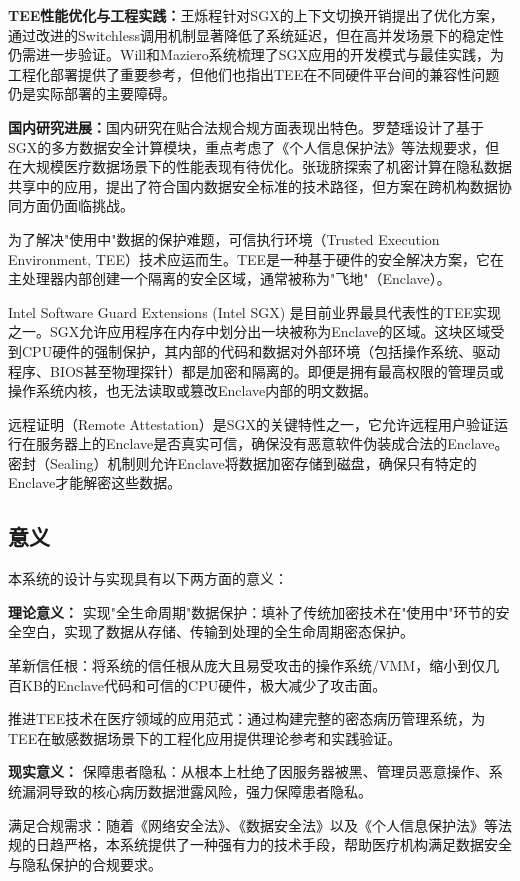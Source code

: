 \documentclass{article}
\begin{document}
\textbf{TEE性能优化与工程实践：}王烁程\cite{ref11}针对SGX的上下文切换开销提出了优化方案，通过改进的Switchless调用机制显著降低了系统延迟，但在高并发场景下的稳定性仍需进一步验证。Will和Maziero\cite{ref12}系统梳理了SGX应用的开发模式与最佳实践，为工程化部署提供了重要参考，但他们也指出TEE在不同硬件平台间的兼容性问题仍是实际部署的主要障碍。

\textbf{国内研究进展：}国内研究在贴合法规合规方面表现出特色。罗楚瑶\cite{ref3}设计了基于SGX的多方数据安全计算模块，重点考虑了《个人信息保护法》等法规要求，但在大规模医疗数据场景下的性能表现有待优化。张珑脐\cite{ref6}探索了机密计算在隐私数据共享中的应用，提出了符合国内数据安全标准的技术路径，但方案在跨机构数据协同方面仍面临挑战。

为了解决"使用中"数据的保护难题，可信执行环境（Trusted Execution Environment, TEE）技术应运而生。TEE是一种基于硬件的安全解决方案，它在主处理器内部创建一个隔离的安全区域，通常被称为"飞地"（Enclave）。

Intel Software Guard Extensions (Intel SGX) 是目前业界最具代表性的TEE实现之一。SGX允许应用程序在内存中划分出一块被称为Enclave的区域。这块区域受到CPU硬件的强制保护，其内部的代码和数据对外部环境（包括操作系统、驱动程序、BIOS甚至物理探针）都是加密和隔离的。即便是拥有最高权限的管理员或操作系统内核，也无法读取或篡改Enclave内部的明文数据。

远程证明（Remote Attestation）是SGX的关键特性之一，它允许远程用户验证运行在服务器上的Enclave是否真实可信，确保没有恶意软件伪装成合法的Enclave。密封（Sealing）机制则允许Enclave将数据加密存储到磁盘，确保只有特定的Enclave才能解密这些数据。

\subsection*{意义}
本系统的设计与实现具有以下两方面的意义：

\textbf{理论意义：}
实现"全生命周期"数据保护：填补了传统加密技术在"使用中"环节的安全空白，实现了数据从存储、传输到处理的全生命周期密态保护。

革新信任根：将系统的信任根从庞大且易受攻击的操作系统/VMM，缩小到仅几百KB的Enclave代码和可信的CPU硬件，极大减少了攻击面。

推进TEE技术在医疗领域的应用范式：通过构建完整的密态病历管理系统，为TEE在敏感数据场景下的工程化应用提供理论参考和实践验证。

\textbf{现实意义：}
保障患者隐私：从根本上杜绝了因服务器被黑、管理员恶意操作、系统漏洞导致的核心病历数据泄露风险，强力保障患者隐私。

满足合规需求：随着《网络安全法》、《数据安全法》以及《个人信息保护法》等法规的日趋严格，本系统提供了一种强有力的技术手段，帮助医疗机构满足数据安全与隐私保护的合规要求。
\end{document}
